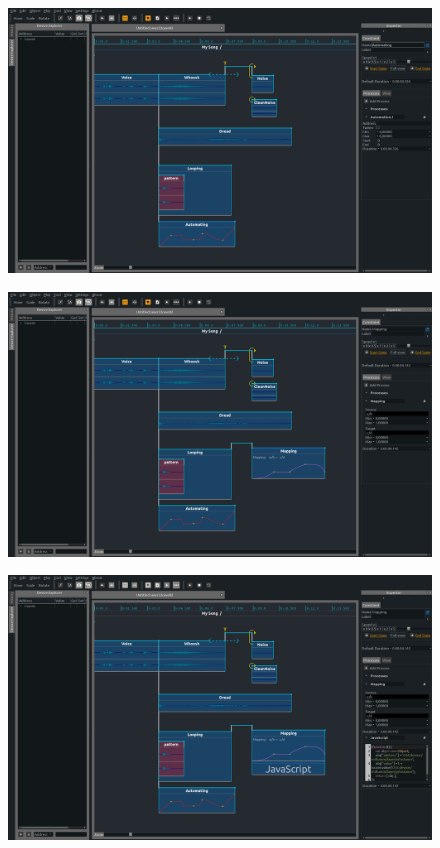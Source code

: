 \documentclass[draft]{beamer}
\begin{document}
\begin{frame} 
    \Large
    \begin{figure}
        \centering
        \includegraphics[width=\textwidth]{images/screens/10.png}
    \end{figure}
\end{frame}
\begin{frame} 
    \Large
    \begin{figure}
        \centering
        \includegraphics[width=\textwidth]{images/screens/11.png}
    \end{figure}
\end{frame}
\begin{frame} 
    \Large
    \begin{figure}
        \centering
        \includegraphics[width=\textwidth]{images/screens/12.png}
    \end{figure}
\end{frame}
\end{document}
